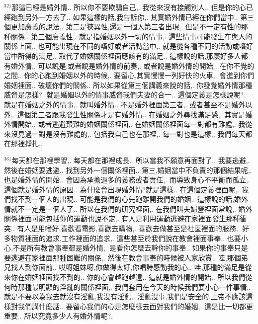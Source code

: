 \documentclass{book}
\begin{document}
$^{321}$那這已經是婚外情..
所以你不要欺騙自己,.
我從來沒有接觸別人,.
但是你的心已經跑到另外一方去了..
如果這樣的話,我告訴你,.
其實婚外情已經在你們當中..
第三個更加廣義的說法,.
第二是狹異性,還是一個人第三者出現,.
但是不一定有性的那種關係..
第三個廣義性,.
就是指婚姻以外一切的情事,.
這些情事可能發生在與人的關係上面,.
也可能出現在不同的嗜好或者活動當中,.
就是從各種不同的活動或嗜好當中所得的滿足,.
取代了婚姻關係裡面應該有的滿足..
這樣說的話,那麼好多人都有婚外情,.
可以說是,或者說是婚外情的前奏,.
或者說是婚外情的開始..
在你不覺的之間,.
你的心跑到婚姻以外的時候,.
要留心,其實慢慢一列好快的火車,.
會進到你們婚姻裡面,.
破壞你們的關係..
所以如果從第三個講義來說的話,.
你發覺婚外情那種威脅是怎樣?.
就是婚姻以外的情事威脅我們夫妻的合一..
這個定義是怎樣說呢?.
就是在婚姻之外的情事,.
就叫婚外情..
不是婚外裡面第三者,.
或者甚至不是婚外以外,.
這個第三者跟我發生性關係才是有婚外情..
在婚姻之外尋找滿足感,.
其實是婚外情開始..
或者逃避艱難的婚姻關係裡面,.
在婚姻關係裡面每一對都有難處,.
我從來沒見過一對是沒有難處的,.
包括我自己也在那裡,.
每一對也是這樣..
我們每天都在那裡掙扎,.

$^{361}$每天都在那裡學習,.
每天都在那裡成長..
所以當我不願意再面對了,.
我要逃避,.
然後在婚姻要逃避,.
找到另外一個關係裡面..
第三,婚姻當中不負責的那個結果呢,.
也是婚外情的開始..
會因為承擔過多的義務或者責任,.
而導致身心不平衡而孤立,.
這個就是婚外情的原因..
為什麼會出現婚外情?就是這樣..
在這個定義裡面呢,.
我們找不到一個人的出現,.
可能是我們的心先跑離開我們的婚姻..
這樣說的話,婚外情就不一定是一個人了..
所以在我們的研究裡面,.
在我們叫夫婦營裡面常說,.
婚外關係裡面可能包括你的運動也說不定,.
有人是利用運動逃避在家裡面發生那種衝突..
有人是用嗜好,喜歡看電影,喜歡去購物,.
喜歡去做甚至是社區裡面的服務,.
好多物質裡面的追求,工作裡面的追求,.
這些甚至於我們說在教會裡面事奉,.
也要小心,不是所有教會事奉都是婚外情,.
是看你怎麼去幹你的事奉..
如果你的事奉只是要逃避在家裡面那種困難的關係,.
然後在教會事奉的時候被人家欣賞,.
哇,那個弟兄找人到你面前,.
哎呀姐妹呀,你做得太好,你唱詩感動我的心,.
哇,那種的滿足是從來你在婚姻裡面找不到的..
你的心會越跑越遠..
這就是婚外情的開始..
所以我們從何時那種最明顯的淫亂的關係裡面,.
我們套用在今天的時候我們要小心一件事情,.
就是不要以為我去就沒有淫亂,我沒有淫亂,.
淫亂沒事,我們是安全的,上帝不應該這樣對我們講什麼話..
要留心我們的心是怎麼樣去面對我們的婚姻,.
這是比一切都更重要..
所以究竟多少人有婚外情呢?.
\end{document}
